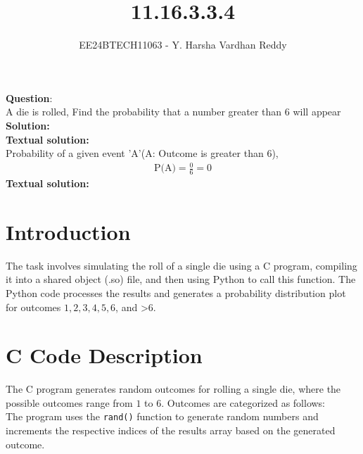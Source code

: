 \documentclass[journal]{IEEEtran}
\begin{document}
	
	
	\vspace{3cm}
	
	\title{11.16.3.3.4}
	\author{EE24BTECH11063 - Y. Harsha Vardhan Reddy }
	{\let\newpage\relax\maketitle}
	
	\renewcommand{\thefigure}{\theenumi}
	\renewcommand{\thetable}{\theenumi}
	\setlength{\intextsep}{10pt} %
	
	
	\renewcommand{\thetable}{\theenumi}
	
	
\textbf{Question}:\\
A die is rolled, Find the probability that a number greater than 6 will appear \\
\textbf{Solution: }\\
\textbf{Textual solution: }\\
Probability of a given event 'A'(A: Outcome is greater than 6),\\
\begin{align}
    \text{P(A)}=\frac{0}{6}=0
\end{align}
\textbf{Textual solution: }\\

\section*{Introduction}
The task involves simulating the roll of a single die using a C program, compiling it into a shared object (.so) file, and then using Python to call this function. The Python code processes the results and generates a probability distribution plot for outcomes \(1, 2, 3, 4, 5, 6\), and \textgreater6.

\section*{C Code Description}
The C program generates random outcomes for rolling a single die, where the possible outcomes range from \(1\) to \(6\). Outcomes are categorized as follows:\\
The program uses the \texttt{rand()} function to generate random numbers and increments the respective indices of the results array based on the generated outcome.
\end{document}
